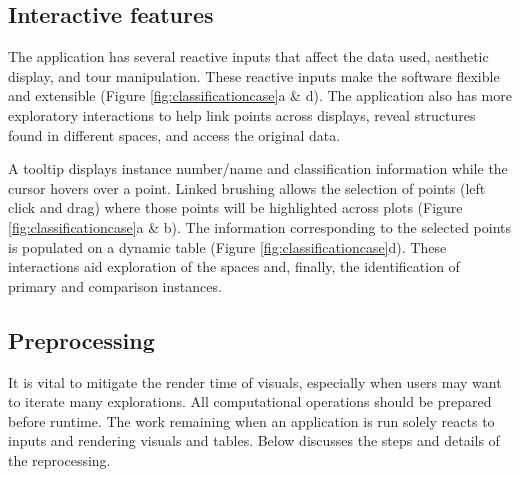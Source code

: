 \documentclass[
]{article}
\begin{document}
\hypertarget{interactive-features}{%
\subsection{Interactive features}\label{interactive-features}}

The application has several reactive inputs that affect the data used, aesthetic display, and tour manipulation. These reactive inputs make the software flexible and extensible (Figure \ref{fig:classificationcase}a \& d). The application also has more exploratory interactions to help link points across displays, reveal structures found in different spaces, and access the original data.

A tooltip displays instance number/name and classification information while the cursor hovers over a point. Linked brushing allows the selection of points (left click and drag) where those points will be highlighted across plots (Figure \ref{fig:classificationcase}a \& b). The information corresponding to the selected points is populated on a dynamic table (Figure \ref{fig:classificationcase}d). These interactions aid exploration of the spaces and, finally, the identification of primary and comparison instances.

\hypertarget{preprocessing}{%
\subsection{Preprocessing}\label{preprocessing}}

It is vital to mitigate the render time of visuals, especially when users may want to iterate many explorations. All computational operations should be prepared before runtime. The work remaining when an application is run solely reacts to inputs and rendering visuals and tables. Below discusses the steps and details of the reprocessing.
\end{document}
